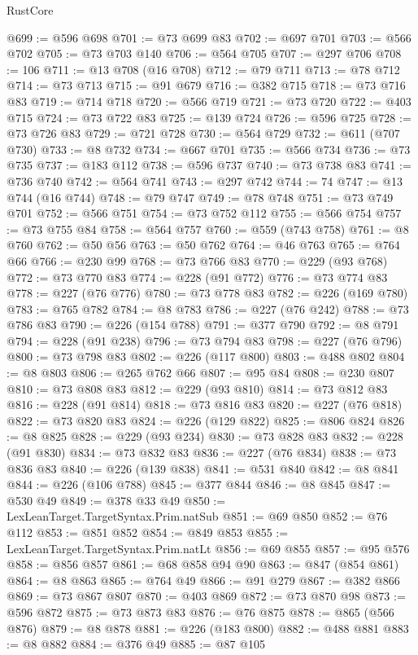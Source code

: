 \begin{lexlean}{RustCore}
\begin{coremodule}
@699 := @596 @698
@701 := @73 @699 @83
@702 := @697 @701
@703 := @566 @702
@705 := @73 @703 @140
@706 := @564 @705
@707 := @297 @706
@708 := 106
@711 := @13 @708 (@16 @708)
@712 := @79 @711
@713 := @78 @712
@714 := @73 @713
@715 := @91 @679
@716 := @382 @715
@718 := @73 @716 @83
@719 := @714 @718
@720 := @566 @719
@721 := @73 @720
@722 := @403 @715
@724 := @73 @722 @83
@725 := @139 @724
@726 := @596 @725
@728 := @73 @726 @83
@729 := @721 @728
@730 := @564 @729
@732 := @611 (@707 @730)
@733 := @8 @732
@734 := @667 @701
@735 := @566 @734
@736 := @73 @735
@737 := @183 @112
@738 := @596 @737
@740 := @73 @738 @83
@741 := @736 @740
@742 := @564 @741
@743 := @297 @742
@744 := 74
@747 := @13 @744 (@16 @744)
@748 := @79 @747
@749 := @78 @748
@751 := @73 @749 @701
@752 := @566 @751
@754 := @73 @752 @112
@755 := @566 @754
@757 := @73 @755 @84
@758 := @564 @757
@760 := @559 (@743 @758)
@761 := @8 @760
@762 := @50 @56
@763 := @50 @762
@764 := @46 @763
@765 := @764 @66
@766 := @230 @99
@768 := @73 @766 @83
@770 := @229 (@93 @768)
@772 := @73 @770 @83
@774 := @228 (@91 @772)
@776 := @73 @774 @83
@778 := @227 (@76 @776)
@780 := @73 @778 @83
@782 := @226 (@169 @780)
@783 := @765 @782
@784 := @8 @783
@786 := @227 (@76 @242)
@788 := @73 @786 @83
@790 := @226 (@154 @788)
@791 := @377 @790
@792 := @8 @791
@794 := @228 (@91 @238)
@796 := @73 @794 @83
@798 := @227 (@76 @796)
@800 := @73 @798 @83
@802 := @226 (@117 @800)
@803 := @488 @802
@804 := @8 @803
@806 := @265 @762 @66
@807 := @95 @84
@808 := @230 @807
@810 := @73 @808 @83
@812 := @229 (@93 @810)
@814 := @73 @812 @83
@816 := @228 (@91 @814)
@818 := @73 @816 @83
@820 := @227 (@76 @818)
@822 := @73 @820 @83
@824 := @226 (@129 @822)
@825 := @806 @824
@826 := @8 @825
@828 := @229 (@93 @234)
@830 := @73 @828 @83
@832 := @228 (@91 @830)
@834 := @73 @832 @83
@836 := @227 (@76 @834)
@838 := @73 @836 @83
@840 := @226 (@139 @838)
@841 := @531 @840
@842 := @8 @841
@844 := @226 (@106 @788)
@845 := @377 @844
@846 := @8 @845
@847 := @530 @49
@849 := @378 @33 @49
@850 := LexLeanTarget.TargetSyntax.Prim.natSub
@851 := @69 @850
@852 := @76 @112
@853 := @851 @852
@854 := @849 @853
@855 := LexLeanTarget.TargetSyntax.Prim.natLt
@856 := @69 @855
@857 := @95 @576
@858 := @856 @857
@861 := @68 @858 @94 @90
@863 := @847 (@854 @861)
@864 := @8 @863
@865 := @764 @49
@866 := @91 @279
@867 := @382 @866
@869 := @73 @867 @807
@870 := @403 @869
@872 := @73 @870 @98
@873 := @596 @872
@875 := @73 @873 @83
@876 := @76 @875
@878 := @865 (@566 @876)
@879 := @8 @878
@881 := @226 (@183 @800)
@882 := @488 @881
@883 := @8 @882
@884 := @376 @49
@885 := @87 @105

\end{coremodule}
\end{lexlean}
